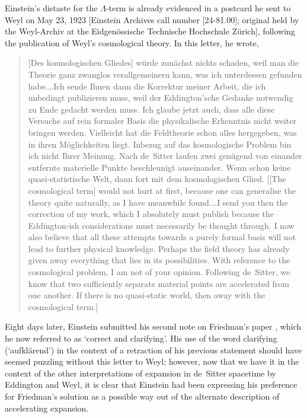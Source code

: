 Einstein's distaste for the $\Lambda$-term is already evidenced in a postcard he sent to Weyl on May 23, 1923 [Einstein Archives call number [24-81.00]; original held by the Weyl-Archiv at the Eidgen\"{o}ssische Technische Hochschule Z\"{u}rich], following the publication of Weyl's cosmological theory. In this letter, he wrote,
\begin{quote}
[Des kosmologischen Gliedes] w\"{u}rde zun\"{a}chst nichts schaden, weil man die Theorie ganz zwanglos verallgemeinern kann, was ich unterdessen gefunden habe.\ldots Ich sende Ihnen dann die Korrektur meiner Arbeit, die ich unbedingt publizieren muss, weil der Eddington'sche Gedanke notwendig zu Ende gedacht werden muss. Ich glaube jetzt auch, dass alle diese Versuche auf rein formaler Basis die physikalische Erkenntnis nicht weiter bringen werden. Vielleicht hat die Feldtheorie schon alles hergegeben, was in ihren M\"{o}glichkeiten liegt. Inbezug auf das kosmologische Problem bin ich nicht Ihrer Meinung. Nach de~Sitter laufen zwei gen\"{u}gend von einander entfernte materielle Punkte beschleunigt auseinander. Wenn schon keine quasi-statistische Welt, dann fort mit dem kosmologischen Glied. [[The cosmological term] would not hurt at first, because one can generalise the theory quite naturally, as I have meanwhile found.\ldots I send you then the correction of my work, which I absolutely must publish because the Eddington-ish considerations must necessarily be thought through. I now also believe that all these attempts towards a purely formal basis will not lead to further physical knowledge. Perhaps the field theory has already given away everything that lies in its possibilities. With reference to the cosmological problem, I am not of your opinion. Following de~Sitter, we know that two sufficiently separate material points are accelerated from one another. If there is no quasi-static world, then away with the cosmological term.]
\end{quote}
Eight days later, Einstein submitted his second note on Friedman's paper \cite{Einstein1923}, which he now referred to as `correct and clarifying'. His use of the word clarifying (`aufkl\"{a}rend') in the context of a retraction of his previous statement should have seemed puzzling without this letter to Weyl; however, now that we have it in the context of the other interpretations of expansion in de~Sitter spacetime by Eddington and Weyl, it is clear that Einstein had been expressing his preference for Friedman's solution as a possible way out of the alternate description of accelerating expansion. 

